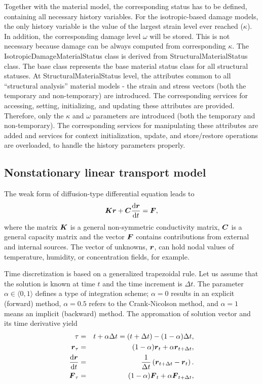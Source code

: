 \documentclass[a4paper]{article}
\newcommand{\mbf}[1]{\mbox{\boldmath$#1$}}
\begin{document}
 Together with the material model, the corresponding status has to be
 defined, containing all necessary history variables.
 For the isotropic-based damage models, the only history variable is
 the value of the largest strain level ever reached ($\kappa$).
 In addition, the corresponding damage level $\omega$ will be stored.
 This is not necessary because damage can be always computed from
 corresponding $\kappa$.
 The IsotropicDamageMaterialStatus class is derived from
 StructuralMaterialStatus class. The base class represents the
 base material status class for all structural statuses. At
 StructuralMaterialStatus level, the attributes common to all
 ``structural analysis'' material models - the strain and
 stress vectors (both the temporary and non-temporary) are introduced. The
 corresponding services for accessing, setting, initializing, and
 updating these attributes are provided.
 Therefore, only the $\kappa$ and $\omega$ parameters are introduced
 (both the temporary and non-temporary). The corresponding services for
 manipulating these attributes are added and services for context
 initialization, update, and store/restore operations are overloaded, to
 handle the history parameters properly.

\subsection{Nonstationary linear transport model}
\label{NonLinTrans}
The weak form of diffusion-type differential equation leads to
\begin{eqnarray}
\mbf{K} \mbf{r} + \mbf{C}\frac{{\rm d}\mbf{r}}{{\rm d} t} = \mbf{F}\label{NonLinTrans:1},
\end{eqnarray}
where the matrix $\mbf{K}$ is a general non-symmetric conductivity matrix, $\mbf{C}$ is a general capacity matrix and the vector $\mbf{F}$ contains contributions from external and internal sources. The vector of unknowns, $\mbf{r}$, can hold nodal values of temperature, humidity, or concentration fields, for example.

Time discretization is based on a generalized trapezoidal rule. Let us assume that the solution is known at time $t$ and the time increment is $\Delta t$. The parameter $\alpha\in\langle 0, 1\rangle$ defines a type of integration scheme; $\alpha=0$ results in an explicit (forward) method, $\alpha=0.5$ refers to the Crank-Nicolson method, and $\alpha=1$ means an implicit (backward) method. The appromation of solution vector and its time derivative yield
\begin{eqnarray}
\tau &=& t+\alpha\Delta t = (t+\Delta t) - (1-\alpha)\Delta t,\label{NonLinTrans:2}\\
\mbf{r}_{\tau} &=& (1-\alpha)\mbf{r}_t+\alpha\mbf{r}_{t+\Delta t},\label{NonLinTrans:3}\\
\frac{{\rm d}\mbf{r}}{{\rm d} t} &=& \frac{1}{\Delta t}\left(\mbf{r}_{t+\Delta t}-\mbf{r}_t\right).\label{NonLinTrans:4}\\
\mbf{F}_{\tau} &=& (1-\alpha)\mbf{F}_t+\alpha\mbf{F}_{t+\Delta t},\label{NonLinTrans:5}
\end{eqnarray}
\end{document}
